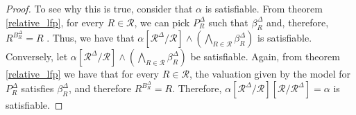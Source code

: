 \documentclass[12pt]{article} %
\begin{document}
\begin{proof}
To see why this is true, consider that $\alpha{}$ is satisfiable. From theorem \ref{relative_lfp}, for every $R \in{} \mathcal{R}$, we can pick $P_{R}^{\Delta}$ such that $\beta_{R}^{\Delta}$ and, therefore, $R^{B_{R}^{\Delta}} = R$ . Thus, we have that $\alpha[\mathcal{R}^{\Delta}/\mathcal{R}] \land{} \left( \bigwedge\limits_{R \in{} \mathcal{R}} \beta_{R}^{\Delta}\right)$ is satisfiable.\\
Conversely, let $\alpha[\mathcal{R}^{\Delta}/\mathcal{R}] \land{} \left( \bigwedge\limits_{R \in{} \mathcal{R}} \beta_{R}^{\Delta}\right)$ be satisfiable. Again, from theorem \ref{relative_lfp} we have that for every $R \in{} \mathcal{R}$, the valuation given by the model for $P_{R}^{\Delta}$ satisfies $\beta_{R}^{\Delta}$, and therefore $R^{B_{R}^{\Delta}} = R$. Therefore, $\alpha[\mathcal{R}^{\Delta}/\mathcal{R}][\mathcal{R}/\mathcal{R}^{\Delta}] = \alpha{}$ is satisfiable.
\end{proof}
\end{document}
